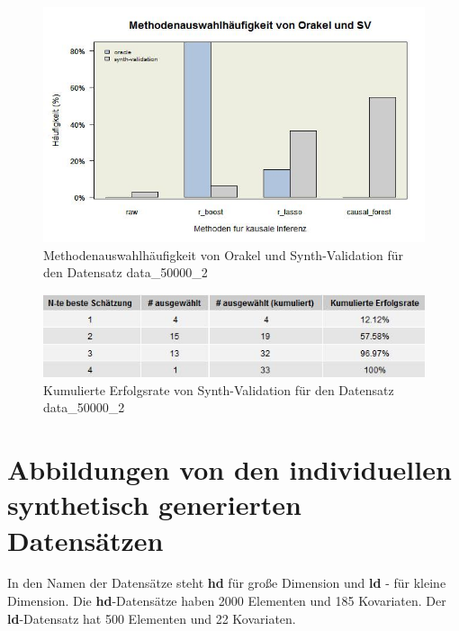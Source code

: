 \documentclass[12pt,a4paper,twoside]{scrartcl}
\numberwithin{equation}{section}
\newcounter{mypagecount}%
\newenvironment{interlude}{%
  \clearpage
  \setcounter{mypagecount}{\value{page}}%
  \thispagestyle{empty}%
  \pagestyle{empty}%
}{%
  \clearpage
  \setcounter{page}{\value{mypagecount}}%
}
\let\chapter=\section %
\begin{document}
\begin{interlude}
\begin{appendices}
\begin{center}
\begin{figure}[H]
    \centering
    \includegraphics[height=0.5\textwidth, width=1\textwidth]{figures/plots/appendix/rawData50000bBarplot.jpeg}
    \caption[Methodenauswahlhäufigkeit von Orakel und Synth-Validation für den Datensatz data\_50000\_2]{Methodenauswahlhäufigkeit von Orakel und Synth-Validation für den Datensatz data\_50000\_2}
  \end{figure}
\end{center}

\begin{center}
\begin{figure}[H]
    \centering
    \includegraphics[height=0.2\textwidth, width=1\textwidth]{figures/plots/appendix/rawData50000bGrid.jpeg}
    \vspace{1mm}
    \caption[Kumulierte Erfolgsrate von Synth-Validation für den Datensatz data\_50000\_2]{Kumulierte Erfolgsrate von Synth-Validation für den Datensatz data\_50000\_2}
  \end{figure}
\end{center}

\clearpage
\chapter{Abbildungen von den individuellen synthetisch generierten Datensätzen}\label{app:b}

\noindent 
In den Namen der Datensätze steht \textbf{hd} für große Dimension und \textbf{ld} - für kleine Dimension. Die \textbf{hd}-Datensätze haben 2000 Elementen und 185 Kovariaten. Der \textbf{ld}-Datensatz hat 500 Elementen und 22 Kovariaten.\par


\end{appendices}
\end{interlude}
\end{document}
